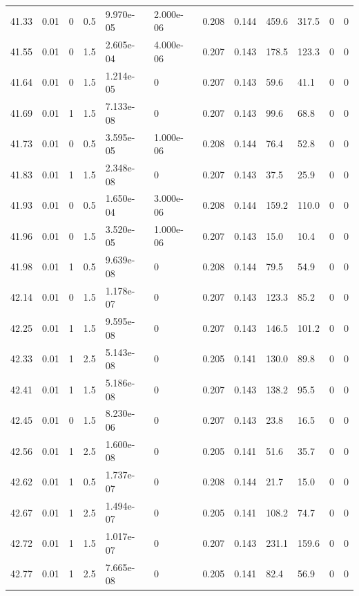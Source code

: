 \documentclass[preview]{standalone}
\begin{document}
{{{{{{{{{{{{{\begin{tabular}{L{1.2cm}C{1.2cm} C{0.3cm}C{0.5cm} C{1.4cm}C{1.4cm} C{1.4cm}C{1.4cm} C{1.6cm}C{1.6cm} C{1.6cm}C{1.6cm}}
  41.33  &  0.01  & 0     & 0.5 &  9.970e-05  & 2.000e-06  &  0.208&   0.144& 459.6 & 317.5   &  0 & 0  \\ 
  41.55  &  0.01  & 0     & 1.5 &  2.605e-04  & 4.000e-06  &  0.207&   0.143& 178.5 & 123.3   &  0 & 0  \\ 
  41.64  &  0.01  & 0     & 1.5 &  1.214e-05  & 0  &  0.207&   0.143& 59.6 & 41.1   &  0 & 0  \\ 
  41.69  &  0.01  & 1     & 1.5 &  7.133e-08  & 0  &  0.207&   0.143& 99.6 & 68.8   &  0 & 0  \\ 
  41.73  &  0.01  & 0     & 0.5 &  3.595e-05  & 1.000e-06  &  0.208&   0.144& 76.4 & 52.8   &  0 & 0  \\ 
  41.83  &  0.01  & 1     & 1.5 &  2.348e-08  & 0  &  0.207&   0.143& 37.5 & 25.9   &  0 & 0  \\ 
  41.93  &  0.01  & 0     & 0.5 &  1.650e-04  & 3.000e-06  &  0.208&   0.144& 159.2 & 110.0   &  0 & 0  \\ 
  41.96  &  0.01  & 0     & 1.5 &  3.520e-05  & 1.000e-06  &  0.207&   0.143& 15.0 & 10.4   &  0 & 0  \\ 
  41.98  &  0.01  & 1     & 0.5 &  9.639e-08  & 0  &  0.208&   0.144& 79.5 & 54.9   &  0 & 0  \\ 
  42.14  &  0.01  & 0     & 1.5 &  1.178e-07  & 0  &  0.207&   0.143& 123.3 & 85.2   &  0 & 0  \\ 
  42.25  &  0.01  & 1     & 1.5 &  9.595e-08  & 0  &  0.207&   0.143& 146.5 & 101.2   &  0 & 0  \\ 
  42.33  &  0.01  & 1     & 2.5 &  5.143e-08  & 0  &  0.205&   0.141& 130.0 & 89.8   &  0 & 0  \\ 
  42.41  &  0.01  & 1     & 1.5 &  5.186e-08  & 0  &  0.207&   0.143& 138.2 & 95.5   &  0 & 0  \\ 
  42.45  &  0.01  & 0     & 1.5 &  8.230e-06  & 0  &  0.207&   0.143& 23.8 & 16.5   &  0 & 0  \\ 
  42.56  &  0.01  & 1     & 2.5 &  1.600e-08  & 0  &  0.205&   0.141& 51.6 & 35.7   &  0 & 0  \\ 
  42.62  &  0.01  & 1     & 0.5 &  1.737e-07  & 0  &  0.208&   0.144& 21.7 & 15.0   &  0 & 0  \\ 
  42.67  &  0.01  & 1     & 2.5 &  1.494e-07  & 0  &  0.205&   0.141& 108.2 & 74.7   &  0 & 0  \\ 
  42.72  &  0.01  & 1     & 1.5 &  1.017e-07  & 0  &  0.207&   0.143& 231.1 & 159.6   &  0 & 0  \\ 
  42.77  &  0.01  & 1     & 2.5 &  7.665e-08  & 0  &  0.205&   0.141& 82.4 & 56.9   &  0 & 0  \\ 

\end{tabular}}}}}}}}}}}}}}
\end{document}
